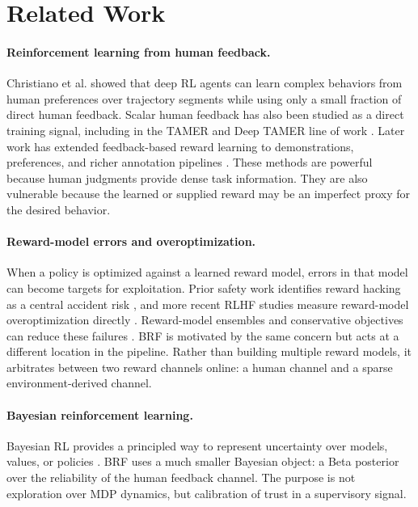 \documentclass[11pt]{article}
\begin{document}
\section{Related Work}

\paragraph{Reinforcement learning from human feedback.}
Christiano et al. \cite{christiano2017deep} showed that deep RL agents can learn complex behaviors from human preferences over trajectory segments while using only a small fraction of direct human feedback. Scalar human feedback has also been studied as a direct training signal, including in the TAMER and Deep TAMER line of work \cite{warnell2018deep}. Later work has extended feedback-based reward learning to demonstrations, preferences, and richer annotation pipelines \cite{ibarz2018reward,yuan2024unirlfh}. These methods are powerful because human judgments provide dense task information. They are also vulnerable because the learned or supplied reward may be an imperfect proxy for the desired behavior.

\paragraph{Reward-model errors and overoptimization.}
When a policy is optimized against a learned reward model, errors in that model can become targets for exploitation. Prior safety work identifies reward hacking as a central accident risk \cite{amodei2016concrete}, and more recent RLHF studies measure reward-model overoptimization directly \cite{gao2023scaling}. Reward-model ensembles and conservative objectives can reduce these failures \cite{coste2023reward,eisenstein2023helping}. BRF is motivated by the same concern but acts at a different location in the pipeline. Rather than building multiple reward models, it arbitrates between two reward channels online: a human channel and a sparse environment-derived channel.

\paragraph{Bayesian reinforcement learning.}
Bayesian RL provides a principled way to represent uncertainty over models, values, or policies \cite{ghavamzadeh2016bayesian}. BRF uses a much smaller Bayesian object: a Beta posterior over the reliability of the human feedback channel. The purpose is not exploration over MDP dynamics, but calibration of trust in a supervisory signal.
\end{document}
